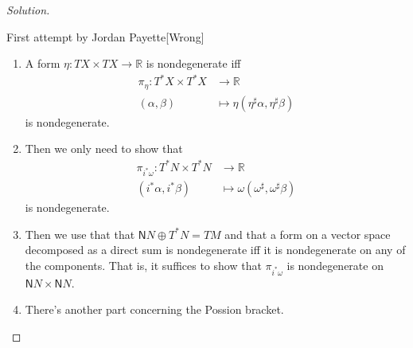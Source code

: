\begin{proof}[Solution]
\begin{idea5}{First attempt by Jordan Payette}[Wrong]
\begin{enumerate}[label=\textbf{Step \arabic*}]
\item \begin{claim}\leavevmode
	A form $\eta:TX\times TX\to \mathbb{R}$ is nondegenerate iff
	\begin{align*}
		\pi_\eta: T^*X\times T^*X &\longrightarrow \mathbb{R} \\
		(\alpha,\beta) &\longmapsto \eta(\eta ^\sharp \alpha,\eta^\sharp\beta)
	\end{align*}
	is nondegenerate.
\end{claim}
\item Then we only need to show that
\begin{align*}
	\pi_{i^*\omega}: T^*N\times T^*N &\longrightarrow \mathbb{R} \\
	(i^*\alpha,i^*\beta) &\longmapsto \omega(\omega ^\sharp,\omega ^\sharp\beta)
\end{align*}
is nondegenerate.

\item Then we use that that $\mathsf{N}N\oplus T^*N=TM$ and that a form on a vector space decomposed as a direct sum is nondegenerate iff it is nondegenerate on any of the components. That is, it suffices to show that $\pi_{i^*\omega}$ is nondegenerate on $\mathsf{N}N\times \mathsf{N}N$.

\item There's another part concerning the Possion bracket.
\end{enumerate}
\end{idea5}
\end{proof}


